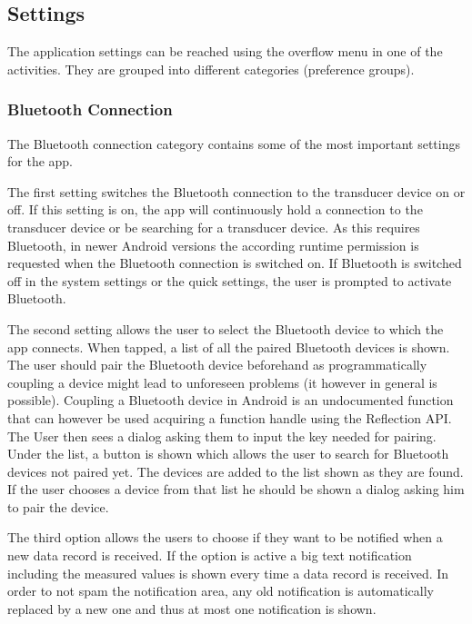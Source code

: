 \subsection{Settings}
The application settings can be reached using the overflow menu in one of the activities. They are grouped into different categories (preference groups).

\subsubsection{Bluetooth Connection}
The Bluetooth connection category contains some of the most important settings for the app. 

The first setting switches the Bluetooth connection to the transducer device on or off. If this setting is on, the app will continuously hold a connection to the transducer device or be searching for a transducer device. As this requires Bluetooth, in newer Android versions the according runtime permission is requested when the Bluetooth connection is switched on. If Bluetooth is switched off in the system settings or the quick settings, the user is prompted to activate Bluetooth.

The second setting allows the user to select the Bluetooth device to which the app connects. When tapped, a list of all the paired Bluetooth devices is shown. The user should pair the Bluetooth device beforehand as programmatically coupling a device might lead to unforeseen problems (it however in general is possible). Coupling a Bluetooth device in Android is an undocumented function that can however be used acquiring a function handle using the Reflection API. The User then sees a dialog asking them to input the key needed for pairing. Under the list, a button is shown which allows the user to search for Bluetooth devices not paired yet. The devices are added to the list shown as they are found. If the user chooses a device from that list he should be shown a dialog asking him to pair the device.

The third option allows the users to choose if they want to be notified when a new data record is received. If the option is active a big text notification including the measured values is shown every time a data record is received. In order to not spam the notification area, any old notification is automatically replaced by a new one and thus at most one notification is shown.

